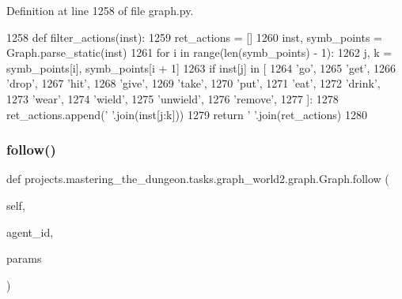 Definition at line 1258 of file graph.\+py.


\begin{DoxyCode}
1258     \textcolor{keyword}{def }filter\_actions(inst):
1259         ret\_actions = []
1260         inst, symb\_points = Graph.parse\_static(inst)
1261         \textcolor{keywordflow}{for} i \textcolor{keywordflow}{in} range(len(symb\_points) - 1):
1262             j, k = symb\_points[i], symb\_points[i + 1]
1263             \textcolor{keywordflow}{if} inst[j] \textcolor{keywordflow}{in} [
1264                 \textcolor{stringliteral}{'go'},
1265                 \textcolor{stringliteral}{'get'},
1266                 \textcolor{stringliteral}{'drop'},
1267                 \textcolor{stringliteral}{'hit'},
1268                 \textcolor{stringliteral}{'give'},
1269                 \textcolor{stringliteral}{'take'},
1270                 \textcolor{stringliteral}{'put'},
1271                 \textcolor{stringliteral}{'eat'},
1272                 \textcolor{stringliteral}{'drink'},
1273                 \textcolor{stringliteral}{'wear'},
1274                 \textcolor{stringliteral}{'wield'},
1275                 \textcolor{stringliteral}{'unwield'},
1276                 \textcolor{stringliteral}{'remove'},
1277             ]:
1278                 ret\_actions.append(\textcolor{stringliteral}{' '}.join(inst[j:k]))
1279         \textcolor{keywordflow}{return} \textcolor{stringliteral}{' '}.join(ret\_actions)
1280 
\end{DoxyCode}
\mbox{\label{classprojects_1_1mastering__the__dungeon_1_1tasks_1_1graph__world2_1_1graph_1_1Graph_a69ce0daca3f7c28c02e0c858d4b7e2e9}} 
\subsubsection{\texorpdfstring{follow()}{follow()}}
{\footnotesize\ttfamily def projects.\+mastering\+\_\+the\+\_\+dungeon.\+tasks.\+graph\+\_\+world2.\+graph.\+Graph.\+follow (\begin{DoxyParamCaption}\item[{}]{self,  }\item[{}]{agent\+\_\+id,  }\item[{}]{params }\end{DoxyParamCaption})}



